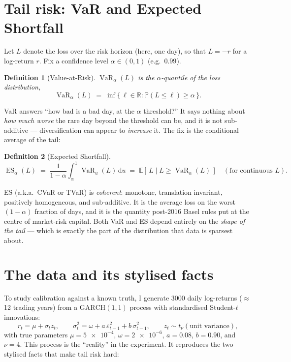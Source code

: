 \documentclass[11pt]{article}
\newtheorem{definition}{Definition}
\newcommand{\VaR}{\operatorname{VaR}}
\newcommand{\ES}{\operatorname{ES}}
\newcommand{\PR}{\mathbb{P}}
\newcommand{\E}{\mathbb{E}}
\begin{document}
\section{Tail risk: VaR and Expected Shortfall}
Let $L$ denote the loss over the risk horizon (here, one day), so that
$L=-r$ for a log-return $r$. Fix a confidence level $\alpha\in(0,1)$
(e.g.\ $0.99$).

\begin{definition}[Value-at-Risk]
$\VaR_\alpha(L)$ is the $\alpha$-quantile of the loss distribution,
\[
   \VaR_\alpha(L) \;=\; \inf\{\,\ell\in\mathbb{R} : \PR(L\le \ell)\ge \alpha\,\}.
\]
\end{definition}

\noindent VaR answers ``how bad is a bad day, at the $\alpha$ threshold?''
It says nothing about \emph{how much worse} the rare day beyond the threshold
can be, and it is not sub-additive --- diversification can appear to
\emph{increase} it. The fix is the conditional average of the tail:

\begin{definition}[Expected Shortfall]
\[
   \ES_\alpha(L) \;=\; \frac{1}{1-\alpha}\int_\alpha^1 \VaR_u(L)\,\mathrm{d}u
   \;=\; \E\!\left[\,L \mid L \ge \VaR_\alpha(L)\,\right]
   \quad(\text{for continuous } L).
\]
\end{definition}

\noindent ES (a.k.a.\ CVaR or TVaR) is \emph{coherent}: monotone, translation
invariant, positively homogeneous, and sub-additive. It is the average loss on
the worst $(1-\alpha)$ fraction of days, and it is the quantity post-2016
Basel rules put at the centre of market-risk capital. Both VaR and ES depend
entirely on the \emph{shape of the tail} --- which is exactly the part of the
distribution that data is sparsest about.

\section{The data and its stylised facts}
To study calibration against a known truth, I generate \num{3000} daily
log-returns ($\approx$12 trading years) from a $\mathrm{GARCH}(1,1)$ process
with standardised Student-$t$ innovations:
\[
  r_t = \mu + \sigma_t z_t,\qquad
  \sigma_t^2 = \omega + a\,\varepsilon_{t-1}^2 + b\,\sigma_{t-1}^2,\qquad
  z_t \sim t_\nu(\text{unit variance}),
\]
with true parameters $\mu=\num{5e-4}$, $\omega=\num{2e-6}$, $a=0.08$,
$b=0.90$, and $\nu=4$. This process is the ``reality'' in the experiment. It
reproduces the two stylised facts that make tail risk hard:
\end{document}
